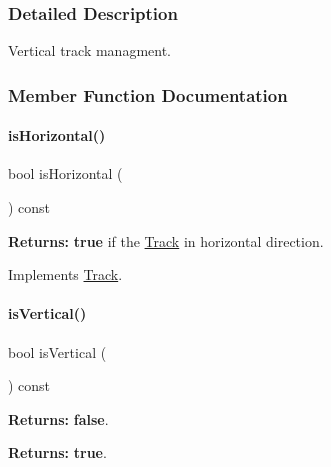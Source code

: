 \subsubsection{Detailed Description}
Vertical track managment. 

\subsubsection{Member Function Documentation}
\mbox{\label{classKite_1_1VerticalTrack_a21b9cefd33ae22e4c2070ad441bdd30b}} 
\paragraph{\texorpdfstring{is\+Horizontal()}{isHorizontal()}}
{\footnotesize\ttfamily bool is\+Horizontal (\begin{DoxyParamCaption}{ }\end{DoxyParamCaption}) const\hspace{0.3cm}{\ttfamily [virtual]}}

{\bfseries Returns\+:} {\bfseries true} if the \mbox{\hyperlink{classKite_1_1Track}{Track}} in horizontal direction. 

Implements \mbox{\hyperlink{classKite_1_1Track_a9d3db1f8a5aca58f8f54d291faebf873}{Track}}.

\mbox{\label{classKite_1_1VerticalTrack_abd54544ef1710ee4b67cfb021d73446c}} 
\paragraph{\texorpdfstring{is\+Vertical()}{isVertical()}}
{\footnotesize\ttfamily bool is\+Vertical (\begin{DoxyParamCaption}{ }\end{DoxyParamCaption}) const\hspace{0.3cm}{\ttfamily [virtual]}}

{\bfseries Returns\+:} {\bfseries false}.

{\bfseries Returns\+:} {\bfseries true}. 

